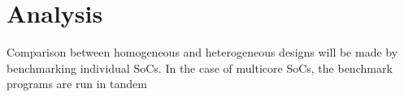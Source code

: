 \chapter{Analysis}
\label{ch:analysis}

Comparison between homogeneous and heterogeneous designs will be made by benchmarking individual SoCs. In the case of multicore SoCs, the benchmark programs are run in tandem 